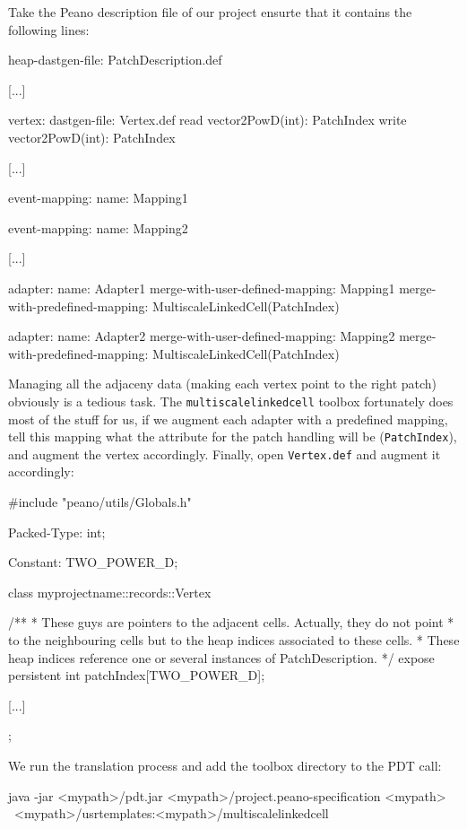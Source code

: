 Take the Peano description file of our project ensurte that it contains the
following lines:
\begin{code}
heap-dastgen-file: PatchDescription.def

[...]

vertex:
  dastgen-file: Vertex.def
  read vector2PowD(int): PatchIndex
  write vector2PowD(int): PatchIndex
  
[...]

event-mapping:
  name: Mapping1


event-mapping:
  name: Mapping2
  
[...]

adapter:
  name: Adapter1
  merge-with-user-defined-mapping: Mapping1
  merge-with-predefined-mapping: MultiscaleLinkedCell(PatchIndex)

adapter:
  name: Adapter2
  merge-with-user-defined-mapping: Mapping2
  merge-with-predefined-mapping: MultiscaleLinkedCell(PatchIndex)
\end{code}

Managing all the adjaceny data (making each vertex point to the right patch)
obviously is a tedious task.
The \texttt{multiscalelinkedcell} toolbox fortunately does most of the stuff for
us, if we augment each adapter with a predefined mapping, tell this mapping what
the attribute for the patch handling will be (\texttt{PatchIndex}), and augment
the vertex accordingly. 
Finally, open \texttt{Vertex.def} and augment it accordingly:

\begin{code}
#include "peano/utils/Globals.h"

Packed-Type:  int;

Constant: TWO_POWER_D;

class myprojectname::records::Vertex {
  /**
   * These guys are pointers to the adjacent cells. Actually, they do not point 
   * to the neighbouring cells but to the heap indices associated to these cells.
   * These heap indices reference one or several instances of PatchDescription.
   */
  expose persistent int patchIndex[TWO_POWER_D];  
  
  [...]
};
\end{code}

We run the translation process and add the toolbox directory to the PDT call:
\begin{code}
 java -jar <mypath>/pdt.jar <mypath>/project.peano-specification <mypath> \
 <mypath>/usrtemplates:<mypath>/multiscalelinkedcell
\end{code}


